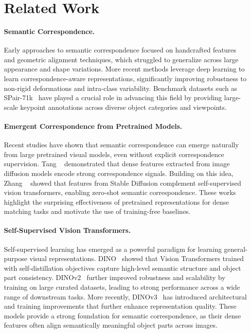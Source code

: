\section{Related Work}
\label{sec:related_work}

\paragraph{Semantic Correspondence.}
Early approaches to semantic correspondence focused on handcrafted features and geometric alignment techniques, which struggled to generalize
across large appearance and shape variations. More recent methods leverage deep learning to learn correspondence-aware representations,
significantly improving robustness to non-rigid deformations and intra-class variability. Benchmark datasets such as SPair-71k~\cite{min2019spair}
have played a crucial role in advancing this field by providing large-scale keypoint annotations across diverse object categories and viewpoints.

\paragraph{Emergent Correspondence from Pretrained Models.}
Recent studies have shown that semantic correspondence can emerge naturally from large pretrained visual models, even without explicit correspondence
supervision. Tang \etal~\cite{tang2023emergent} demonstrated that dense features extracted from image diffusion models encode strong correspondence
signals. Building on this idea, Zhang \etal~\cite{zhang2023tale} showed that features from Stable Diffusion complement self-supervised vision
transformers, enabling zero-shot semantic correspondence. These works highlight the surprising effectiveness of pretrained representations for dense
matching tasks and motivate the use of training-free baselines.

\paragraph{Self-Supervised Vision Transformers.}
Self-supervised learning has emerged as a powerful paradigm for learning general-purpose visual representations. DINO~\cite{caron2021emerging} showed
that Vision Transformers trained with self-distillation objectives capture high-level semantic structure and object part consistency. DINOv2~\cite{oquab2023dinov2}
further improved robustness and scalability by training on large curated datasets, leading to strong performance across a wide range of downstream
tasks. More recently, DINOv3~\cite{simeoni2025dinov3} has introduced architectural and training improvements that further enhance representation
quality. These models provide a strong foundation for semantic correspondence, as their dense features often align semantically meaningful object parts across images.

